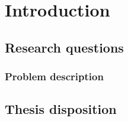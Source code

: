 \chapter{Introduction}%
\label{sec:introduction}



\section{Research questions}


\subsection*{Problem description}%
\label{sec:segmentation-description}


\clearpage
\section{Thesis disposition}

